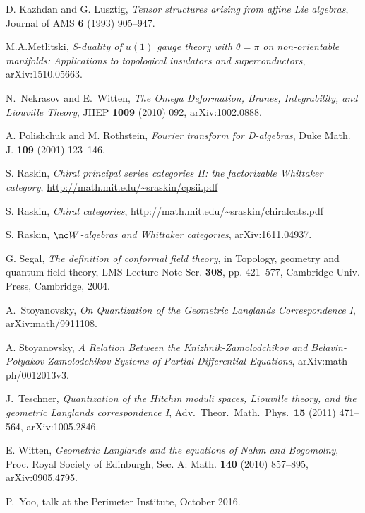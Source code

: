 \documentclass[11pt,reqno]{amsart}
\theoremstyle{plain}
\numberwithin{equation}{section}
\theoremstyle{definition}
\begin{document}
\begin{thebibliography}{AFO}
 D. Kazhdan and G. Lusztig, {\em Tensor structures arising
from affine Lie algebras}, Journal of AMS {\bf 6} (1993) 905--947.

 M.A.Metlitski,
  {\em S-duality of $u(1)$ gauge theory with $\theta =\pi$ on
    non-orientable manifolds: Applications to topological insulators
    and superconductors}, arXiv:1510.05663.
  
 N.~Nekrasov and E.~Witten, {\em The Omega Deformation, Branes,
Integrability, and Liouville Theory}, JHEP {\bf 1009} (2010) 092,
arXiv:1002.0888.

 A. Polishchuk and M. Rothstein, {\em Fourier transform for
D-algebras}, Duke Math. J. {\bf 109} (2001) 123--146.

 S. Raskin, {\em Chiral principal series categories II: the
  factorizable Whittaker category}, \linebreak
\url{http://math.mit.edu/~sraskin/cpsii.pdf}

 S. Raskin, {\em Chiral categories},
\url{http://math.mit.edu/~sraskin/chiralcats.pdf}

 S. Raskin, {\em ${\mc W}$-algebras and Whittaker
    categories}, arXiv:1611.04937.

 G. Segal, {\em The definition of conformal field theory},
in Topology, geometry and quantum field theory, LMS Lecture Note
Ser. {\bf 308}, pp. 421--577, Cambridge Univ. Press, Cambridge, 2004.

 A.~Stoyanovsky, {\em On Quantization of the Geometric
  Langlands Correspondence I}, arXiv:math/9911108.

 A. Stoyanovsky, {\em A Relation Between the
  Knizhnik-Zamolodchikov and Belavin-Polyakov-Zamolodchikov Systems of
  Partial Differential Equations}, arXiv:math-ph/0012013v3.

 J.~Teschner, {\em Quantization of the Hitchin moduli spaces,
  Liouville theory, and the geometric Langlands correspondence I},
Adv.\ Theor.\ Math.\ Phys.\ {\bf 15} (2011) 471--564, arXiv:1005.2846.

 E. Witten, {\em Geometric Langlands and the equations of
  Nahm and Bogomolny}, Proc. Royal Society of Edinburgh,
Sec. A: Math. {\bf 140} (2010) 857--895, arXiv:0905.4795.

 P.~Yoo, talk at the Perimeter Institute, October
2016.

\end{thebibliography}
\end{document}
